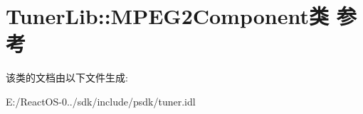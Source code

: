 \hypertarget{class_tuner_lib_1_1_m_p_e_g2_component}{}\section{Tuner\+Lib\+:\+:M\+P\+E\+G2\+Component类 参考}
\label{class_tuner_lib_1_1_m_p_e_g2_component}


该类的文档由以下文件生成\+:\begin{DoxyCompactItemize}
\item 
E\+:/\+React\+O\+S-\/0../sdk/include/psdk/tuner.\+idl\end{DoxyCompactItemize}
